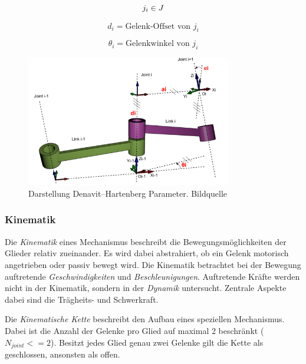 \begin{displaymath}
j_i \in J \\
\end{displaymath}

\begin{equation}
d_i =  \text{Gelenk-Offset von } j_i
\end{equation}

\begin{equation}
\theta_i =  \text{Gelenkwinkel von } j_i 
\end{equation}

\begin{figure}[H]
	\centering
	\includegraphics[width=0.8\textwidth]{fig/dh}   
	\caption[Darstellung Denavit–Hartenberg Parameter]{Darstellung Denavit–Hartenberg Parameter. Bildquelle \cite{wiki}}
	\label{fig:ik-dh}
\end{figure}

\subsubsection{Kinematik}
\label{sec:basics-ik-k}

Die \textit{Kinematik} eines Mechanismus beschreibt die Bewegungsmöglichkeiten der Glieder relativ zueinander. Es wird dabei abstrahiert, ob ein Gelenk motorisch angetrieben oder passiv bewegt wird. Die Kinematik betrachtet bei der Bewegung auftretende \textit{Geschwindigkeiten} und \textit{Beschleunigungen}. Auftretende Kräfte werden nicht in der Kinematik, sondern in der \textit{Dynamik} untersucht. Zentrale Aspekte dabei sind die Trägheits- und Schwerkraft.

Die \textit{Kinematische Kette} beschreibt den Aufbau eines speziellen Mechanismus. Dabei ist die Anzahl der Gelenke pro Glied auf maximal 2 beschränkt ($N_{joint} <= 2$). Besitzt jedes Glied genau zwei Gelenke gilt die Kette als geschlossen, ansonsten als offen.

